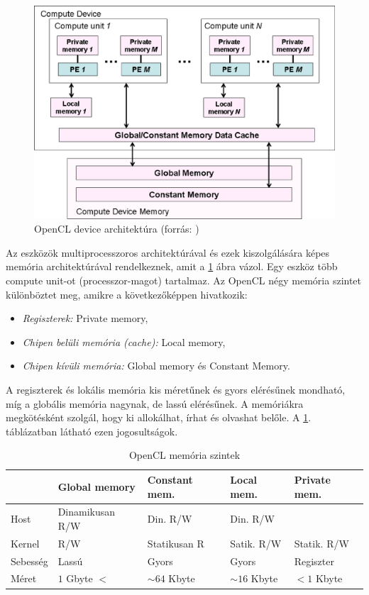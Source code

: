 	\begin{figure}[!ht]
		\centering
		\includegraphics[width=0.6\columnwidth]{figures/eps/device.eps}
		\caption[OpenCL device architektúra]{OpenCL device architektúra (forrás: \cite{opencl})} 
		\label{fig:device} 
	\end{figure}
	Az eszközök multiprocesszoros architektúrával és ezek kiszolgálására képes
	memória architektúrával rendelkeznek, amit a \ref{fig:device} ábra vázol.
	Egy eszköz több compute unit-ot (processzor-magot) tartalmaz.
	Az OpenCL négy memória szintet különböztet meg, amikre a
	következőképpen hivatkozik:
	\begin{itemize}
		\item \emph{Regiszterek:} Private memory,
		\item \emph{Chipen belüli memória (cache):} Local memory,
		\item \emph{Chipen kívüli memória:} Global memory és Constant Memory.
	\end{itemize}
	A regiszterek és lokális memória kis méretűnek és gyors elérésűnek mondható, míg
	a globális memória nagynak, de lassú elérésűnek.
	A memóriákra megkötésként szolgál, hogy ki allokálhat, írhat és olvashat
	belőle. A \ref{table:mem}. táblázatban látható ezen jogosultságok.
	\begin{table}[!h]
	\centering
	\begin{tabular}{l|l|l|l|l}
			 & Global memory & Constant mem. & Local mem. & Private mem.\\ \hline
		Host & Dinamikusan R/W & Din. R/W & Din. R/W & \\
		Kernel & R/W & Statikusan R & Satik. R/W & Statik. R/W\\
		Sebesség & Lassú & Gyors & Gyors & Regiszter\\
		Méret & $1$ Gbyte $<$ & $\sim64$ Kbyte& $\sim16$ Kbyte & $<1$ Kbyte
	\end{tabular}
	
	\caption{OpenCL memória szintek}
	\label{table:mem}
	\end{table}
	
